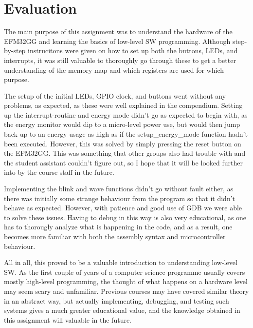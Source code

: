 \section{Evaluation}

The main purpose of this assignment was to understand the hardware of the EFM32GG and learning the basics of low-level SW programming. Although step-by-step instrucitons were given on how to set up both the buttons, LEDs, and interrupts, it was still valuable to thoroughly go through these to get a better understanding of the memory map and which registers are used for which purpose.

The setup of the initial LEDs, GPIO clock, and buttons went without any problems, as expected, as these were well explained in the compendium\cite{compendium}. Setting up the interrupt-routine and energy mode didn't go as expected to begin with, as the energy monitor would dip to a micro-level power use, but would then jump back up to an energy usage as high as if the setup_energy_mode function hadn't been executed. However, this was solved by simply pressing the reset button on the EFM32GG. This was something that other groups also had trouble with and the student assistant couldn't figure out, so I hope that it will be looked further into by the course staff in the future.

Implementing the blink and wave functions didn't go without fault either, as there was initially some strange behaviour from the program so that it didn't behave as expected. However, with patience and good use of GDB we were able to solve these issues. Having to debug in this way is also very educational, as one has to thorougly analyze what is happening in the code, and as a result, one becomes more familiar with both the assembly syntax and microcontroller behaviour.

All in all, this proved to be a valuable introduction to understanding low-level SW. As the first couple of years of a computer science programme usually covers mostly high-level programming, the thought of what happens on a hardware level may seem scary and unfamiliar. Previous courses may have covered similar theory in an abstract way, but actually implementing, debugging, and testing such systems gives a much greater educational value, and the knowledge obtained in this assignment will valuable in the future.